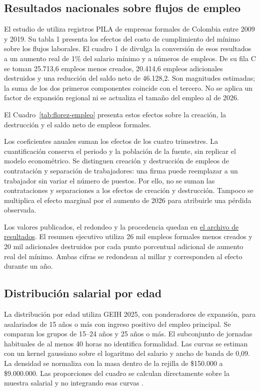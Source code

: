 \subsection{Resultados nacionales sobre flujos de empleo}

El estudio de \citet{florez2022} utiliza registros PILA de empresas formales de Colombia entre 2009 y 2019. Su tabla 1 presenta los efectos del costo de cumplimiento del mínimo sobre los flujos laborales. El cuadro 1 de \citet{banrepFlujos2022} divulga la conversión de esos resultados a un aumento real de 1\% del salario mínimo y a números de empleos. De su fila C se toman 25.713,6 empleos menos creados, 20.414,6 empleos adicionales destruidos y una reducción del saldo neto de 46.128,2. Son magnitudes estimadas; la suma de los dos primeros componentes coincide con el tercero. No se aplica un factor de expansión regional ni se actualiza el tamaño del empleo al de 2026.

El Cuadro~\ref{tab:florez-empleo} presenta estos efectos sobre la creación, la destrucción y el saldo neto de empleos formales.



Los coeficientes anuales suman los efectos de los cuatro trimestres. La cuantificación conserva el periodo y la población de la fuente, sin replicar el modelo econométrico. Se distinguen creación y destrucción de empleos de contratación y separación de trabajadores: una firma puede reemplazar a un trabajador sin variar el número de puestos. Por ello, no se suman las contrataciones y separaciones a los efectos de creación y destrucción. Tampoco se multiplica el efecto marginal por el aumento de 2026 para atribuirle una pérdida observada.

Los valores publicados, el redondeo y la procedencia quedan en \href{https://github.com/oliverpardo1979/Informe-CJC-SM/blob/main/data/empleo_florez_2022.csv}{el archivo de resultados}. El resumen ejecutivo utiliza 26 mil empleos formales menos creados y 20 mil adicionales destruidos por cada punto porcentual adicional de aumento real del mínimo. Ambas cifras se redondean al millar y corresponden al efecto durante un año.

\subsection{Distribución salarial por edad}

La distribución por edad utiliza GEIH 2025, con ponderadores de expansión, para asalariados de 15 años o más con ingreso positivo del empleo principal. Se comparan los grupos de 15--24 años y 25 años o más. El subconjunto de jornadas habituales de al menos 40 horas no identifica formalidad. Las curvas se estiman con un kernel gaussiano sobre el logaritmo del salario y ancho de banda de 0,09. La densidad se normaliza con la masa dentro de la rejilla de \$150.000 a \$9.000.000. Las proporciones del cuadro se calculan directamente sobre la muestra salarial y no integrando esas curvas \citep{orozcoGEIH}.

